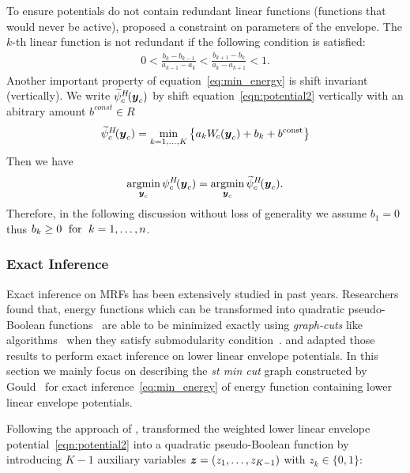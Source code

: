 \documentclass[sigconf, anonymous, review]{acmart}
\renewcommand{\citename}{\citet}
\renewcommand{\cite}{\citep}
\begin{document}
To ensure potentials do not contain redundant linear functions
(functions that would never be active), \citename{gouldlearning}
proposed a constraint on parameters of the envelope. The $k$-th
linear function is not redundant if the following condition is
satisfied:
%
\begin{align}
    0
    <
    \frac{b_k - b_{k-1}}{a_{k-1} - a_k}
    <
    \frac{b_{k+1} - b_k}{a_k - a_{k+1}}
    <
    1.
  \label{eq:nonredundant}
\end{align}
%
Another important property of equation~\eqref{eq:min_energy} is
shift invariant~\cite{gouldlearning} (vertically). We write
$\widetilde{\psi}^{H}_c\!({\boldsymbol{y}}_c)$ by shift equation~\eqref{eqn:potential2} vertically
with an abitrary amount $b^{const}\in R$
$$\widetilde{\psi}^{H}_c\!({\boldsymbol{y}}_c) = \min_{k=1, \ldots, K}
\left\{a_k W_{\!c}({\boldsymbol{y}}_c) + b_k + b^\textrm{const} \right\}$$
%
Then we have
\begin{align}
  \mathop{\textrm{argmin}}_{{\boldsymbol{y}}_c} \psi^H_c\!({\boldsymbol{y}}_c)
  = \mathop{\textrm{argmin}}_{{\boldsymbol{y}}_c} \widetilde{\psi}^{H}_c\!({\boldsymbol{y}}_c).
  \label{eq:shift_invariant}
\end{align}
%
Therefore, in the following discussion without loss of generality
we assume $b_1 = 0$ thus $b_k\geq0 \text{\; for \;} k=1,\dots,n$.
%
\subsubsection{Exact Inference}
\label{sec:exact_inference}

Exact inference on MRFs has been extensively studied in past
years. Researchers found that, energy functions which can be
transformed into quadratic pseudo-Boolean
functions~\cite{Ishikawa:PAMI03,Ishikawa:CVPR09,Rother:CVPR09}
are able to be minimized exactly using \emph{graph-cuts} like
algorithms~\cite{Freedman:CVPR05,Hammer:1965} when they satisfy
submodularity condition~\cite{Boros:MATH02}.
\citename{Kohli:TR08} and \citename{Gould:ICML2011} adapted those
results to perform exact inference on lower linear envelope
potentials. In this section we mainly focus on describing the
\emph{st min cut} graph constructed by
Gould~\cite{Gould:ICML2011,gouldlearning} for exact
inference~\eqref{eq:min_energy} of energy function containing
lower linear envelope potentials.

Following the approach of \citename{Kohli:CVPR10},
\citename{Gould:ICML2011,gouldlearning} transformed the weighted
lower linear envelope potential~\eqref{eqn:potential2} into a
quadratic pseudo-Boolean function by introducing $K-1$ auxiliary
variables ${\boldsymbol{z}} = \left(z_1, \ldots, z_{K-1}\right)$ with $z_k\in
\{0,1\}$:
\end{document}
